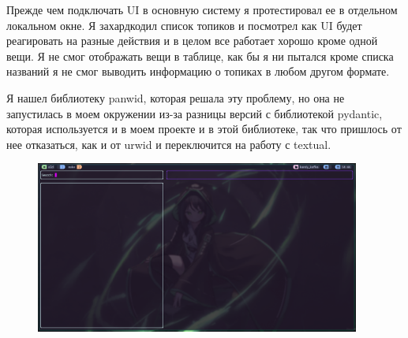 \documentclass[10pt , a4paper]{report}
\begin{document}
Прежде чем подключать UI в основную систему я протестировал ее в отдельном локальном окне. Я захардкодил список топиков и посмотрел как UI будет реагировать на разные действия и в целом все работает хорошо кроме одной вещи. Я не смог отображать вещи в таблице, как бы я ни пытался кроме списка названий я не смог выводить информацию о топиках в любом другом формате.

Я нашел библиотеку panwid, которая решала эту проблему, но она не запустилась в моем окружении из-за разницы версий с библиотекой pydantic, которая используется и в моем проекте и в этой библиотеке, так что пришлось от нее отказаться, как и от urwid и переключится на работу с textual.

\begin{figure}[htbp]
  \begin{center}
    \includegraphics[width=0.95\textwidth]{imgs/UIFirstScreen.png}
  \end{center}
  \caption{}\label{fig:}
\end{figure}
\end{document}
